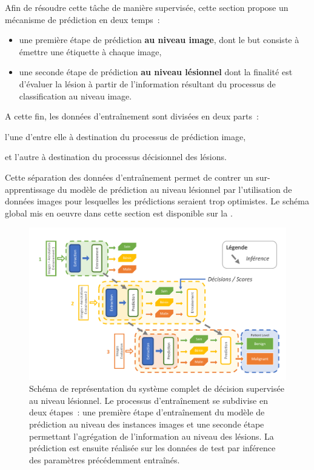 Afin de résoudre cette tâche de manière supervisée, cette section propose un mécanisme de prédiction en deux temps~: 
\begin{itemize}
    \item une première étape de prédiction \textbf{au niveau image}, dont le but consiste à émettre une étiquette à chaque image,
    \item une seconde étape de prédiction \textbf{au niveau lésionnel} dont la finalité est d'évaluer la lésion à partir de l'information résultant du processus de classification au niveau image.
\end{itemize} A cette fin, les données d'entraînement sont divisées en deux parts~:
\begin{inlinerate}
    \item l'une d'entre elle à destination du processus de prédiction image,
    \item et l'autre à destination du processus décisionnel des lésions.
\end{inlinerate}
Cette séparation des données d'entraînement permet de contrer un sur-apprentissage du modèle de prédiction au niveau lésionnel par l'utilisation de données images pour lesquelles les prédictions seraient trop optimistes. Le schéma global mis en oeuvre dans cette section est disponible sur la .\par

\begin{figure}[H]
    \centering
    \includegraphics[width=0.95\linewidth]{contents/chapter_6/resources/scheme_patient_decision.pdf}
    \caption{Schéma de représentation du système complet de décision supervisée au niveau lésionnel. Le processus d'entraînement se subdivise en deux étapes~: une première étape d'entraînement du modèle de prédiction au niveau des instances images et une seconde étape permettant l'agrégation de l'information au niveau des lésions. La prédiction est ensuite réalisée sur les données de test par inférence des paramètres précédemment entraînés.}
    \label{fig:scheme_patient_decision}
\end{figure}\par

